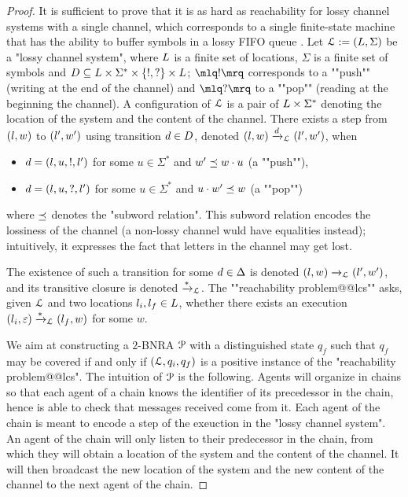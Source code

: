 \ifproofs
\begin{proof}
It is sufficient to prove that it is as hard as reachability for lossy channel systems with a single channel, which corresponds to a single finite-state machine that has the ability to buffer symbols in a lossy FIFO queue \cite{Schnoebelen2002verifying}.
Let $\mathcal{L} := (L,\Sigma)$ be a "lossy channel system", where $L$ is a finite set of locations, $\Sigma$ is a finite set of symbols and $D \subseteq L \times \Sigma^* \times \{!, ?\} \times L$; $\quotemarks{!}$ corresponds to a ""push"" (writing at the end of the channel) and $\quotemarks{?}$ to a ""pop"" (reading at the beginning the channel). A configuration of $\mathcal{L}$ is a pair of $L \times \Sigma^*$ denoting the location of the system and the content of the channel. There exists a step from $(l,w)$ to $(l',w')$ using transition $d \in D$, denoted $(l,w) \xrightarrow{d}_{\mathcal{L}} (l',w')$, when
\begin{itemize}
\item $d = (l,u,!,l')$ for some $u \in \Sigma^*$ and $w' \preceq w \cdot u$ (a ""push""),
\item $d = (l,u,?,l')$ for some $u \in \Sigma^*$ and $u \cdot w' \preceq w$ (a ""pop"")
\end{itemize}
where $\preceq$ denotes the "subword relation".
This subword relation encodes the lossiness of the channel (a non-lossy channel wuld have equalities instead); intuitively, it expresses the fact that letters in the channel may get lost. 

The existence of such a transition for some $d \in \Delta$ is denoted $(l,w) \xrightarrow{}_{\mathcal{L}} (l',w')$, and its transitive closure is denoted $\xrightarrow{*}_{\mathcal{L}}$. The ""reachability problem@@lcs"" asks, given $\mathcal{L}$ and two locations $l_i, l_f \in L$, whether there exists an execution $(l_i,\varepsilon) \xrightarrow{*}_{\mathcal{L}} (l_f, w)$ for some $w$. 

We aim at constructing a $2$-BNRA $\mathcal{P}$ with a distinguished state $q_f$ such that $q_f$ may be covered if and only if $(\mathcal{L}, q_i, q_f)$ is a positive instance of the "reachability problem@@lcs". 
The intuition of $\mathcal{P}$ is the following. Agents will organize in chains so that each agent of a chain knows the identifier of its precedessor in the chain, hence is able to check that messages received come from it. Each agent of the chain is meant to encode a step of the exeuction in the "lossy channel system". 
An agent of the chain will only listen to their predecessor in the chain, from which they will obtain a location of the system and the content of the channel. It will then broadcast the new location of the system and the new content of the channel to the next agent of the chain. 


\end{proof}
